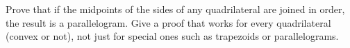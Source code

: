 Prove that if the midpoints of the sides of any quadrilateral are joined in order, the result is a parallelogram. Give a proof that works for every quadrilateral (convex or not), not just for special ones such as trapezoids or parallelograms.
